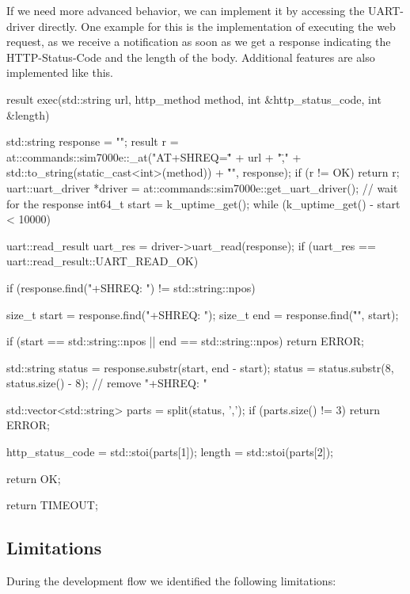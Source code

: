 If we need more advanced behavior, we can implement it by accessing the UART-driver directly. One example for this is the implementation of executing the web request, as we receive a notification as soon as we get a response indicating the HTTP-Status-Code and the length of the body. Additional features are also implemented like this.

\begin{cpp}[caption={Send message function and parse the HTTP-Status-Code and response length}]
result exec(std::string url, http_method method, int &http_status_code, int &length)
{
    std::string response = "";
    result r = at::commands::sim7000e::_at("AT+SHREQ=\"" + url + "\"," + std::to_string(static_cast<int>(method)) + "\r\n", response);
    if (r != OK)
    {
        return r;
    }
    uart::uart_driver *driver = at::commands::sim7000e::get_uart_driver();
    // wait for the response
    int64_t start = k_uptime_get();
    while (k_uptime_get() - start < 10000)
    {
        uart::read_result uart_res = driver->uart_read(response);
        if (uart_res == uart::read_result::UART_READ_OK)
        {
            if (response.find("+SHREQ: ") != std::string::npos)
            {
                size_t start = response.find("+SHREQ: ");
                size_t end = response.find("\r\n", start);

                if (start == std::string::npos || end == std::string::npos)
                {
                    return ERROR;
                }

                std::string status = response.substr(start, end - start);
                status = status.substr(8, status.size() - 8); // remove "+SHREQ: "

                std::vector<std::string> parts = split(status, ',');
                if (parts.size() != 3)
                {
                    return ERROR;
                }

                http_status_code = std::stoi(parts[1]);
                length = std::stoi(parts[2]);

                return OK;
            }
        }
    }

    return TIMEOUT;
}
\end{cpp}

\subsection{Limitations}

During the development flow we identified the following limitations:

